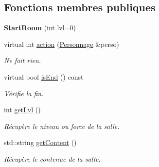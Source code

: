 \subsection*{Fonctions membres publiques}
\begin{DoxyCompactItemize}
\item 
\hypertarget{class_start_room_ac92cf89ae4fac37b88a708fb762314d8}{{\bfseries Start\-Room} (int lvl=0)}\label{class_start_room_ac92cf89ae4fac37b88a708fb762314d8}

\item 
virtual int \hyperlink{class_start_room_aae3c5e25ac0742c84ac6596d57bf3edb}{action} (\hyperlink{class_personnage}{Personnage} \&perso)
\begin{DoxyCompactList}\small\item\em Ne fait rien. \end{DoxyCompactList}\item 
virtual bool \hyperlink{class_room_comportement_a240991f90b07c35e0e9114e6a203ba88}{is\-End} () const 
\begin{DoxyCompactList}\small\item\em Vérifie la fin. \end{DoxyCompactList}\item 
int \hyperlink{class_room_comportement_a645473f228c0e73532a309ad512456eb}{get\-Lvl} ()
\begin{DoxyCompactList}\small\item\em Récupère le niveau ou force de la salle. \end{DoxyCompactList}\item 
std\-::string \hyperlink{class_room_comportement_a6927d638d17858a303d77b449c7552b4}{get\-Content} ()
\begin{DoxyCompactList}\small\item\em Récupère le contenue de la salle. \end{DoxyCompactList}\end{DoxyCompactItemize}
